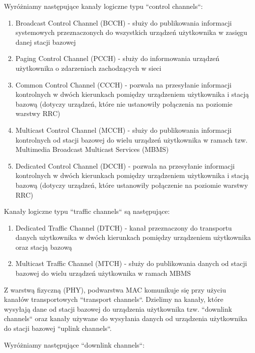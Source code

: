 Wyróżniamy następujące kanały logiczne typu ``control channels``:

\begin{enumerate}
	\item Broadcast Control Channel (BCCH) - służy do publikowania informacji systemowych przeznaczonych do wszystkich urządzeń użytkownika w zasięgu danej stacji bazowej
	\item Paging Control Channel (PCCH) - służy do informowania urządzeń użytkownika o zdarzeniach zachodzących w sieci
	\item Common Control Channel (CCCH) - pozwala na przesyłanie informacji kontrolnych w dwóch kierunkach pomiędzy urządzeniem użytkownika i stacją bazową (dotyczy urządzeń, które nie ustanowiły połączenia na poziomie warstwy RRC)
	\item Multicast Control Channel (MCCH) - służy do publikowania informacji kontrolnych od stacji bazowej do wielu urządzeń użytkownika w ramach tzw. Multimedia Broadcast Multicast Services (MBMS)
	\item Dedicated Control Channel (DCCH) - pozwala na przesyłanie informacji kontrolnych w dwóch kierunkach pomiędzy urządzeniem użytkownika i stacją bazową (dotyczy urządzeń, które ustanowiły połączenie na poziomie warstwy RRC)
\end{enumerate}

Kanały logiczne typu ``traffic channels`` są następujące:

\begin{enumerate}
	\item Dedicated Traffic Channel (DTCH) - kanał przeznaczony do transportu danych użytkownika w dwóch kierunkach pomiędzy urządzeniem użytkownika oraz stacją bazową
	\item Multicast Traffic Channel (MTCH) - służy do publikowania danych od stacji bazowej do wielu urządzeń użytkownika w ramach MBMS
\end{enumerate}

Z warstwą fizyczną (PHY), podwarstwa MAC komunikuje się przy użyciu kanałów transportowych ``transport channels``. Dzielimy na kanały, które wysyłają dane od stacji bazowej do urządzenia użytkownika tzw. ``downlink channels`` oraz kanały używane do wysyłania danych od urządzenia użytkownika do stacji bazowej ``uplink channels``.

Wyróżniamy następujące ``downlink channels``:

